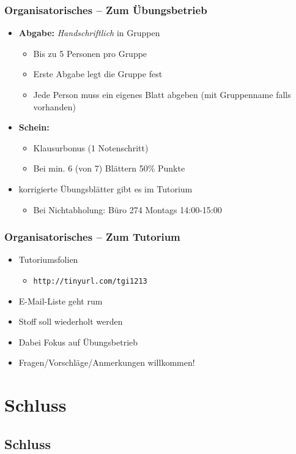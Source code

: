\begin{frame}
	\frametitle{Organisatorisches -- Zum Übungsbetrieb}
	\begin{itemize}
		\item \textbf{Abgabe:} \emph{Handschriftlich} in Gruppen
		\begin{itemize}
			\item Bis zu 5 Personen pro Gruppe
			\item Erste Abgabe legt die Gruppe fest
			\item Jede Person muss ein eigenes Blatt abgeben (mit Gruppenname falls vorhanden)
		\end{itemize}
		\item \textbf{Schein:} 
		\begin{itemize}
			\item Klausurbonus (1 Notenschritt)
			\item Bei min. 6 (von 7) Blättern 50\% Punkte
		\end{itemize}
		\item korrigierte Übungsblätter gibt es im Tutorium
		\begin{itemize}
			\item Bei Nichtabholung: Büro 274 Montags 14:00-15:00
		\end{itemize}
	\end{itemize}
\end{frame}
\begin{frame}
	\frametitle{Organisatorisches -- Zum Tutorium}
	\begin{itemize}
	\item Tutoriumsfolien
		\begin{itemize}
			\item \texttt{http://tinyurl.com/tgi1213}
		\end{itemize}
		\item E-Mail-Liste geht rum
		\item Stoff soll wiederholt werden
		\item Dabei Fokus auf Übungsbetrieb
		\item Fragen/Vorschläge/Anmerkungen willkommen!
	\end{itemize}
\end{frame}

\section{Schluss}
\subsection{Schluss}

